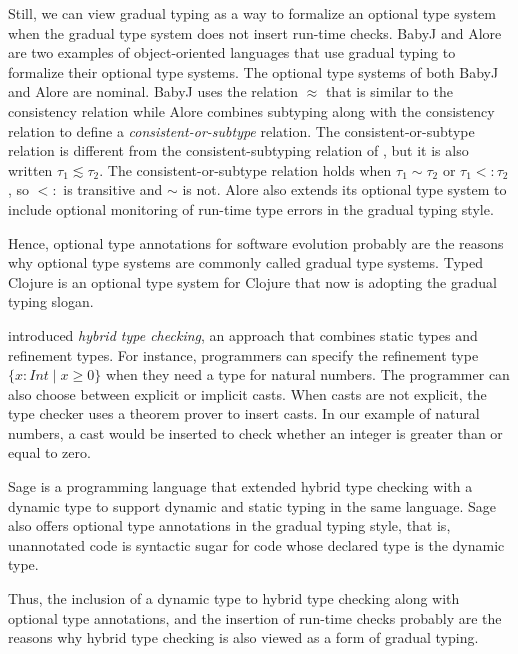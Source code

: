\documentclass[preprint]{sig-alternate}
\begin{document}
Still, we can view gradual typing as a way to formalize an optional
type system when the gradual type system does not insert run-time
checks.
BabyJ \citep{anderson2002babyj} and Alore \citep{lehtosalo2011alore}
are two examples of object-oriented languages that use gradual
typing to formalize their optional type systems.
The optional type systems of both BabyJ and Alore are nominal.
BabyJ uses the relation $\approx$ that is similar to the consistency
relation while Alore combines  subtyping along with the consistency
relation to define a \textit{consistent-or-subtype} relation.
The consistent-or-subtype relation is different from the
consistent-subtyping relation of \citet{siek2007objects}, but it is
also written $\tau_{1} \lesssim \tau_{2}$.
The consistent-or-subtype relation holds when $\tau_{1} \sim \tau_{2}$
or $\tau_{1} <: \tau_{2}$, so $<:$ is transitive and $\sim$ is not.
Alore also extends its optional type system to include optional
monitoring of run-time type errors in the gradual typing style.

Hence, optional type annotations for software evolution probably are
the reasons why optional type systems are commonly called
gradual type systems.
Typed Clojure \citep{bonnaire-sergeant2012typed-clojure} is an
optional type system for Clojure that now is adopting the
gradual typing slogan.

\citet{flanagan2006htc} introduced \textit{hybrid type checking},
an approach that combines static types and refinement types.
For instance, programmers can specify the refinement type
$\{x:Int \;|\; x \ge 0\}$ when they need a type for natural numbers.
The programmer can also choose between explicit or implicit casts.
When casts are not explicit, the type checker uses a theorem prover
to insert casts.
In our example of natural numbers, a cast would be inserted to check
whether an integer is greater than or equal to zero.

Sage \citep{gronski2006sage} is a programming language that
extended hybrid type checking with a dynamic type to
support dynamic and static typing in the same language.
Sage also offers optional type annotations in the gradual typing
style, that is, unannotated code is syntactic sugar for
code whose declared type is the dynamic type.

Thus, the inclusion of a dynamic type to hybrid type checking
along with optional type annotations, and the insertion of run-time
checks probably are the reasons why hybrid type checking is
also viewed as a form of gradual typing. 
\end{document}
